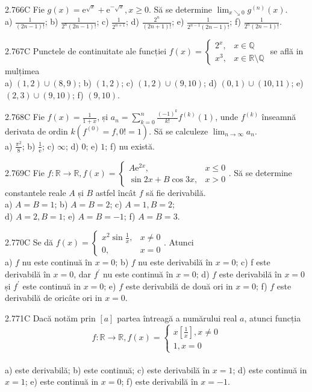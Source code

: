 \documentclass[11pt]{article}
\begin{document}
2.766C Fie $g(x)=\mathrm{e}^{\sqrt{x}}+\mathrm{e}^{-\sqrt{x}}, x \geq 0$. Să se determine $\lim _{x \searrow 0} g^{(n)}(x)$.\\ a) $\frac{1}{(2 n-1)!}$; b) $\frac{1}{2^{n}(2 n-1)!}$; c) $\frac{1}{2^{n+1}}$; d) $\frac{2^{n}}{(2 n+1)!}$; e) $\frac{1}{2^{n-1}(2 n-1)!}$; f) $\frac{1}{2^{n}(2 n-1)!}$. 

2.767C Punctele de continuitate ale funcției $f(x)=\left\{\begin{array}{ll}2^{x}, & x \in \mathbb{Q} \\ x^{3}, & x \in \mathbb{R} \setminus \mathbb{Q}\end{array}\right.$ se află in mulțimea\\ a) $(1,2) \cup(8,9)$; b) $(1,2)$; c) $(1,2) \cup(9,10)$; d) $(0,1) \cup(10,11)$; e) $(2,3) \cup(9,10)$; f) $(9,10)$.

2.768C Fie $f(x)=\frac{1}{1+x}$, și $a_{n}=\sum_{k=0}^{n} \frac{(-1)^{k}}{k!} f^{(k)}(1)$, unde $f^{(k)}$ înseamnă derivata de ordin $k\left(f^{(0)}=f, 0!=1\right)$. Să se calculeze $\lim _{n \rightarrow \infty} a_{n}$.\\ a) $\frac{\pi^{2}}{8}$; b) $\frac{1}{\mathrm{e}}$; c) $\infty$; d) $0$; e) $1$; f) nu există.

2.769C Fie $f: \mathbb{R} \rightarrow \mathbb{R}, f(x) = \begin{cases} A \mathrm{e}^{2x}, & x \leq 0 \\ \sin{2 x}+B \cos{3 x}, & x > 0\end{cases}$. Să se determine constantele reale $A$ și $B$ astfel încât $f$ să fie derivabilă.\\ a) $A=B=1$; b) $A=B=2$; c) $A=1, B=2$;\\ d) $A=2, B=1$; e) $A=B=-1$; f) $A=B=3$.

2.770C Se dă $f(x)=\left\{\begin{array}{ll}x^{2} \sin \frac{1}{x}, & x \neq 0 \\ 0, & x=0\end{array}\right.$. Atunci\\ a) $f$ nu este continuă în $x=0$; b) $f$ nu este derivabilă în $x=0$; c) f este derivabilă în $x=0$, dar $f^{\prime}$ nu este continuă în $x=0$; d) $f$ este derivabilă în $x=0$ și $f^{\prime}$ este continuă in $x=0$; e) $f$ este derivabilă de două ori in $x=0$; f) $f$ este derivabilă de oricâte ori in $x=0$.

2.771C Dacă notăm prin $[a]$ partea întreagă a numărului real $a$, atunci funcția $$f: \mathbb{R} \rightarrow \mathbb{R}, f(x)=\left\{\begin{array}{l}x\left[\frac{1}{x}\right], x \neq 0 \\1, x=0\end{array}\right.$$\\ a) este derivabilă; b) este continuă; c) este derivabilă în $x=1$; d) este continuă in $x=1$; e) este continuă in $x=0$; f) este derivabilă în $x=-1$.
\end{document}

